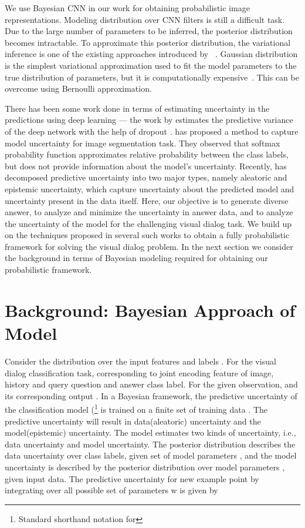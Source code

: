 \documentclass[review]{elsarticle}
\begin{document}
We use Bayesian CNN in our work for obtaining probabilistic image representations. Modeling distribution over CNN filters is still a difficult task. Due to the large number of parameters to be inferred, the posterior distribution becomes intractable. To approximate this posterior distribution, the variational inference is one of the existing approaches introduced by ~\cite{Hinton_ACM1993, Barber_NATO1998, Graves_NIPS2011, Blundell_ARX2015}.
Gaussian distribution is the simplest variational approximation used to fit the model parameters to the true distribution of parameters, but it is computationally expensive~\cite{Blundell_ARX2015}. This can be overcome using Bernoulli approximation. 

There has been some work done in terms of estimating uncertainty in the predictions using deep learning — the work by \cite{Gal_ICML2016} estimates the predictive variance of the deep network with the help of dropout \cite{srivastava2014dropout}. \cite{kendall2015bayesian} has proposed a method to capture model uncertainty for image segmentation task. They observed that softmax probability function approximates relative probability between the class labels, but does not provide information about the model's uncertainty. Recently, \cite{Kendall_NIPS2017} has decomposed predictive uncertainty into two major types, namely aleatoric and epistemic uncertainty, which capture uncertainty\cite{smith2018understanding,teye2018bayesian} about the predicted model and uncertainty present in the data itself. Here, our objective is to generate diverse answer, to analyze and minimize the uncertainty in answer data, and to analyze the uncertainty of the model for the challenging visual dialog task. We build up on the techniques proposed in several such works to obtain a fully probabilistic framework for solving the visual dialog problem. In the next section we consider the background in terms of Bayesian modeling required for obtaining our probabilistic framework.



\section{Background: Bayesian Approach of Model}
Consider the distribution  over the input features  and labels . For the visual dialog classification task,  corresponding to joint encoding feature of image, history and query question and  answer class label. For the given observation,  and its corresponding output . In a Bayesian framework, the predictive uncertainty of the classification model (\footnote{Standard shorthand notation for } is trained on a  finite set of training data . The predictive uncertainty will result in data(aleatoric) uncertainty and the model(epistemic) uncertainty. The model estimates two kinds of uncertainty, i.e., data uncertainty and model uncertainty. The posterior distribution describes the data uncertainty over class labels, given set of model parameters , and the model uncertainty is described by the posterior distribution over model parameters , given input data. The predictive uncertainty for new example point  by integrating over all possible set of parameters w is given by 
\end{document}
